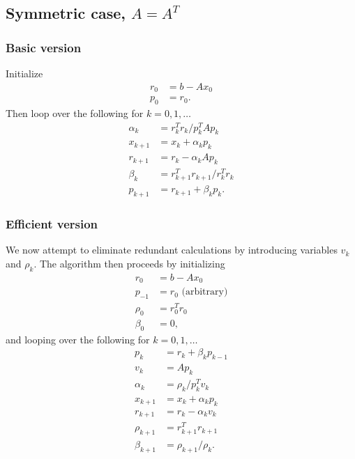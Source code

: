 \documentclass{article}
\begin{document}
\subsection{Symmetric case, $A = A^T$}
\subsubsection{Basic version}
Initialize
    \begin{subequations}\begin{align}
    r_0 &= b - Ax_0 \\
    p_0 &= r_0.
    \end{align}\end{subequations}
Then loop over the following for $k = 0, 1, \ldots$
    \begin{subequations}\begin{align}
    \alpha_k &= r_k^T r_k / p_k^T A p_k \\
    x_{k+1} &= x_k + \alpha_k p_k \\
    r_{k+1} &= r_k - \alpha_k A p_k \\
    \beta_k &= r_{k+1}^T r_{k+1} / r_k^T r_k \\
    p_{k+1} &= r_{k+1} + \beta_k p_k. 
    \end{align}\end{subequations}

\subsubsection{Efficient version}
We now attempt to eliminate redundant calculations by introducing variables
    $v_k$ and $\rho_k$.
The algorithm then proceeds by initializing
    \begin{subequations}\begin{align}
    r_0 &= b - Ax_0 \\
    p_{-1} &= r_0 \text{ (arbitrary)} \\
    \rho_{0} &= r_0^T r_0 \\
    \beta_0 &= 0,
    \end{align}\end{subequations}
and looping over the following for $k = 0, 1, \ldots$
    \begin{subequations}\begin{align}
    p_{k} &= r_{k} + \beta_k p_{k-1} \\
    v_k &= A p_k \\
    \alpha_k &= \rho_k / p_k^T v_k \\
    x_{k+1} &= x_k + \alpha_k p_k \\
    r_{k+1} &= r_k - \alpha_k v_k \\
    \rho_{k+1} &= r_{k+1}^T r_{k+1} \\
    \beta_{k+1} &= \rho_{k+1} / \rho_k.
    \end{align}\end{subequations}
\end{document}
